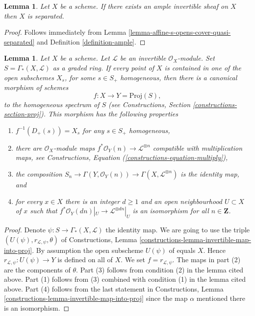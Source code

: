 \documentclass{stacks-project}
\theoremstyle{plain}
\newtheorem{lemma}[subsection]{Lemma}
\theoremstyle{definition}
\theoremstyle{remark}
\numberwithin{equation}{subsection}
\begin{document}
\begin{lemma}
\label{lemma-ample-separated}
Let $X$ be a scheme. If there exists an ample invertible sheaf on $X$
then $X$ is separated.
\end{lemma}

\begin{proof}
Follows immediately from
Lemma \ref{lemma-affine-s-opens-cover-quasi-separated} and
Definition \ref{definition-ample}.
\end{proof}

\begin{lemma}
\label{lemma-map-into-proj}
Let $X$ be a scheme.
Let $\mathcal{L}$ be an invertible $\mathcal{O}_X$-module.
Set $S = \Gamma_*(X, \mathcal{L})$ as a graded ring.
If every point of $X$ is contained in one of the
open subschemes $X_s$, for some $s \in S_{+}$ homogeneous, then
there is a canonical morphism of schemes
$$
f : X \longrightarrow Y = \text{Proj}(S),
$$
to the homogeneous spectrum of $S$ (see
Constructions, Section \ref{constructions-section-proj}).
This morphism has the following properties
\begin{enumerate}
\item $f^{-1}(D_{+}(s)) = X_s$ for any $s \in S_{+}$ homogeneous,
\item there are $\mathcal{O}_X$-module maps
$f^*\mathcal{O}_Y(n) \to \mathcal{L}^{\otimes n}$
compatible with multiplication maps, see
Constructions, Equation (\ref{constructions-equation-multiply}),
\item the composition
$S_n \to \Gamma(Y, \mathcal{O}_Y(n)) \to \Gamma(X, \mathcal{L}^{\otimes n})$
is the identity map, and
\item for every $x \in X$ there is an integer $d \geq 1$
and an open neighbourhood $U \subset X$ of $x$
such that $f^*\mathcal{O}_Y(dn)|_U \to \mathcal{L}^{\otimes dn}|_U$
is an isomorphism for all $n \in \mathbf{Z}$.
\end{enumerate}
\end{lemma}

\begin{proof}
Denote $\psi : S \to \Gamma_*(X, \mathcal{L})$ the identity map.
We are going to use the triple
$(U(\psi), r_{\mathcal{L}, \psi}, \theta)$ of
Constructions, Lemma \ref{constructions-lemma-invertible-map-into-proj}.
By assumption the open subscheme $U(\psi)$ of equals $X$. Hence
$r_{\mathcal{L}, \psi} : U(\psi) \to Y$ is defined on all of $X$.
We set $f = r_{\mathcal{L}, \psi}$.
The maps in part (2) are the components of $\theta$.
Part (3) follows from condition (2) in the lemma cited above.
Part (1) follows from (3) combined with condition (1) in the lemma
cited above. Part (4) follows from the last statement in
Constructions, Lemma \ref{constructions-lemma-invertible-map-into-proj}
since the map $\alpha$ mentioned there is an isomorphism.
\end{proof}
\end{document}
